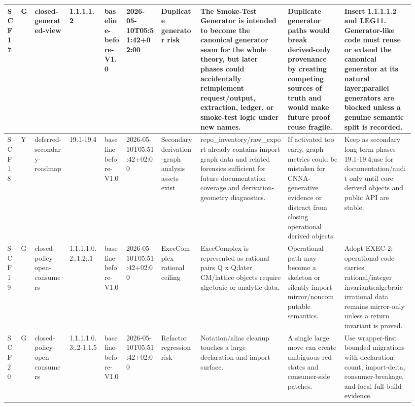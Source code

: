 \begin{longtable}{L{0.03\linewidth} L{0.026\linewidth} L{0.087\linewidth} L{0.085\linewidth} L{0.052\linewidth} L{0.085\linewidth} L{0.095\linewidth} L{0.205\linewidth} L{0.13\linewidth} L{0.165\linewidth}}
\hline
\addlinespace[0.24em]
SCF17 & G & closed-generated-view & 1.1.1.1.2 & baseline-before-V1.0 & 2026-05-10T05:51:42+02:00 & Duplicate generator risk & The Smoke-Test Generator is intended to become the canonical generator seam for the whole theory, but later phases could accidentally reimplement request/\allowbreak{}output, extraction, ledger, or smoke-test logic under new names. & Duplicate generator paths would break derived-only provenance by creating competing sources of truth and would make future proof reuse fragile. & Insert 1.1.1.1.2 and LEG11. Generator-like code must reuse or extend the canonical generator at its natural layer;\newline parallel generators are blocked unless a genuine semantic split is recorded.\\
\hline
\addlinespace[0.24em]
SCF18 & Y & deferred-secondary-roadmap & 19.1-19.4 & baseline-before-V1.0 & 2026-05-10T05:51:42+02:00 & Secondary derivation-graph analysis assets exist & repo\_inventory/\allowbreak{}raw\_export already contains import graph data and related forensics sufficient for future documentation coverage and derivation-geometry diagnostics. & If activated too early, graph metrics could be mistaken for CNNA-generative evidence or distract from closing operational derived objects. & Keep as secondary long-term phases 19.1-19.4;\newline use for documentation/\allowbreak{}audit only until core derived objects and public API are stable.\\
\hline
\addlinespace[0.24em]
SCF19 & G & closed-policy-open-consumers & 1.1.1.1.0.2;.1.2;.1 & baseline-before-V1.0 & 2026-05-10T05:51:42+02:00 & ExecComplex rational ceiling & ExecComplex is represented as rational pairs Q x Q;\newline later CM/\allowbreak{}lattice objects require algebraic or analytic data. & Operational path may become a skeleton or silently import mirror/\allowbreak{}noncomputable semantics. & Adopt EXEC-2: operational code carries rational/\allowbreak{}integer invariants;\newline algebraic irrational data remains mirror-only unless a return invariant is proved.\\
\hline
\addlinespace[0.24em]
SCF20 & G & closed-policy-open-consumers & 1.1.1.1.0.3;.2-1.1.5 & baseline-before-V1.0 & 2026-05-10T05:51:42+02:00 & Refactor regression risk & Notation/\allowbreak{}alias cleanup touches a large declaration and import surface. & A single large move can create ambiguous red states and consumer-side patches. & Use wrapper-first bounded migrations with declaration-count, import-delta, consumer-breakage, and local full-build evidence.\\

\end{longtable}
